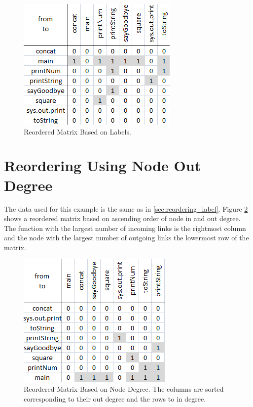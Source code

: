 \begin{figure}[H]
  \centering
  \includegraphics[scale=0.9]{images/Reordering_Example_label.png}
  \caption{Reordered Matrix Based on Labels. \label{fig:reordering_example_label}}
\end{figure}


\section{Reordering Using Node Out Degree}
The data used for this example is the same as in \ref{sec:reordering_label}. Figure \ref{fig:reordering_example_degree} shows a reordered matrix based on ascending order of node in and out degree. The function with the largest number of incoming links is the rightmost column and the node with the largest number of outgoing links the lowermost row of the matrix.

\begin{figure}[H]
  \centering
  \includegraphics[scale=0.9]{images/Reordering_Example_degree.png}
  \caption{Reordered Matrix Based on Node Degree. The columns are sorted corresponding to their out degree and the rows to in degree. \label{fig:reordering_example_degree}}
\end{figure}



